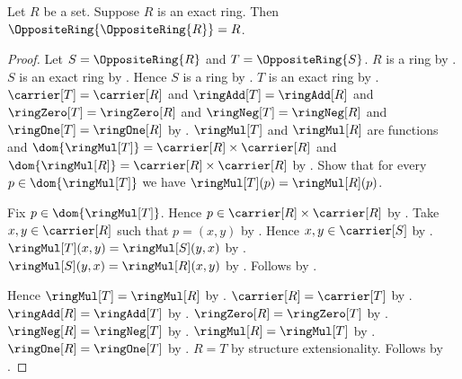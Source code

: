 \begin{theorem}\label{spike_opposite_ring_involutive}
    Let $R$ be a set.
    Suppose $R$ is an exact ring.
    Then $\OppositeRing{\OppositeRing{R}}=R$.
\end{theorem}
\begin{proof}
    Let $S=\OppositeRing{R}$ and $T=\OppositeRing{S}$.
    $R$ is a ring by \auto.
    $S$ is an exact ring by .
    Hence $S$ is a ring by \auto.
    $T$ is an exact ring by .
    $\carrier[T]=\carrier[R]$ and
        $\ringAdd[T]=\ringAdd[R]$ and
        $\ringZero[T]=\ringZero[R]$ and
        $\ringNeg[T]=\ringNeg[R]$ and
        $\ringOne[T]=\ringOne[R]$ by
        .
    $\ringMul[T]$ and $\ringMul[R]$ are functions and
        $\dom{\ringMul[T]}=\carrier[R]\times\carrier[R]$ and
        $\dom{\ringMul[R]}=\carrier[R]\times\carrier[R]$ by
        .
    Show that for every $p\in\dom{\ringMul[T]}$ we have
        $\ringMul[T](p)=\ringMul[R](p)$.
    \begin{subproof}
        Fix $p\in\dom{\ringMul[T]}$.
        Hence $p\in\carrier[R]\times\carrier[R]$ by \auto.
        Take $x,y\in\carrier[R]$ such that $p=(x,y)$ by
            .
        Hence $x,y\in\carrier[S]$ by
            .
        $\ringMul[T](x,y)=\ringMul[S](y,x)$ by
            .
        $\ringMul[S](y,x)=\ringMul[R](x,y)$ by
            .
        Follows by \auto.
    \end{subproof}
    Hence $\ringMul[T]=\ringMul[R]$ by .
    $\carrier[R]=\carrier[T]$ by \auto.
    $\ringAdd[R]=\ringAdd[T]$ by \auto.
    $\ringZero[R]=\ringZero[T]$ by \auto.
    $\ringNeg[R]=\ringNeg[T]$ by \auto.
    $\ringMul[R]=\ringMul[T]$ by \auto.
    $\ringOne[R]=\ringOne[T]$ by \auto.
    $R=T$ by structure extensionality.
    Follows by \auto.
\end{proof}


